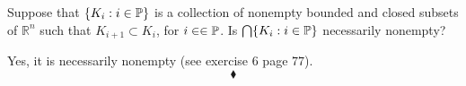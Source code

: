 \renewcommand{\thesubsection}{\thesection.\RomanNumeralCaps{3}}
\subsection{}

\begin{tcolorbox}
Suppose that $\{K_i:i\in\mathbb{P}\}$ is a collection of nonempty bounded and closed subsets of $\mathbb{R}^n$ such that $K_{i+1}\subset K_i$, for $i\in \in\mathbb{P}$. Is $\bigcap\{K_i:i\in\mathbb{P}\}$ necessarily nonempty?
\end{tcolorbox}
Yes, it is necessarily nonempty (see exercise $6$ page $77$).
$$\blacklozenge$$
\newpage
\renewcommand{\thesubsection}{\thesection.\RomanNumeralCaps{4}}
\subsection{}

